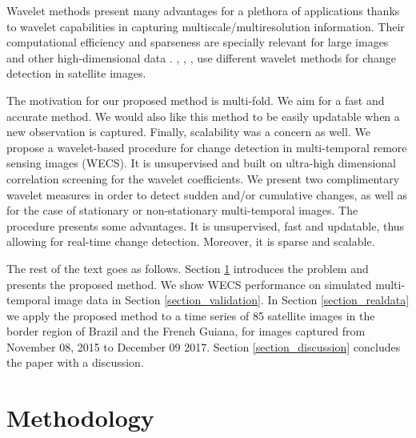\documentclass[journal]{IEEEtran}
\begin{document}
Wavelet methods present many advantages for a plethora of applications \cite{vidakovic1999statistical} thanks to wavelet capabilities in capturing multiscale/multiresolution information. Their computational efficiency and sparseness are specially relevant for large images and other high-dimensional data \cite{morettin2017wavelets}. \cite{atto2012multidate}, \cite{bouhlel2015multivariate}, \cite{celik2009multiscale}, \cite{cui2012statistical} use different wavelet methods for change detection in satellite images. 

The motivation for our proposed method is multi-fold. We aim for a fast and accurate method. We would also like this method to be easily updatable when a new observation is captured. Finally, scalability was a concern as well. We propose a wavelet-based procedure for change detection in multi-temporal remore sensing images (WECS). It is unsupervised and built on ultra-high dimensional correlation screening \cite{fan2020statistical} for the wavelet coefficients.  We present two complimentary wavelet measures in order to detect sudden and/or cumulative changes, as well as for the case of stationary or non-stationary multi-temporal images. The procedure presents some advantages. It is unsupervised, fast and updatable, thus allowing for real-time change detection. Moreover, it is sparse and scalable. 

The rest of the text goes as follows. Section \ref{section_method} introduces the problem and presents the proposed method. We show WECS performance on simulated multi-temporal image data in Section \ref{section_validation}. In Section \ref{section_realdata} we apply the proposed method to a time series of 85 satellite images in the border region of Brazil and the French Guiana, for  images captured from November 08, 2015 to December 09 2017.  Section \ref{section_discussion} concludes the paper with a discussion.


\section{Methodology}\label{section_method}
\end{document}
